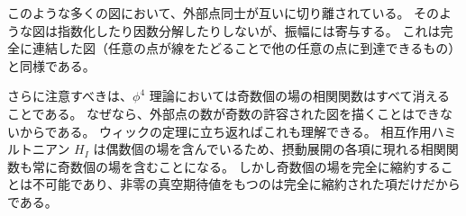 \documentclass[a4paper,12pt]{article}
\begin{document}
このような多くの図において、外部点同士が互いに切り離されている。  
そのような図は指数化したり因数分解したりしないが、振幅には寄与する。  
これは完全に連結した図（任意の点が線をたどることで他の任意の点に到達できるもの）と同様である。  


さらに注意すべきは、$\phi^4$ 理論においては奇数個の場の相関関数はすべて消えることである。  
なぜなら、外部点の数が奇数の許容された図を描くことはできないからである。  
ウィックの定理に立ち返ればこれも理解できる。  
相互作用ハミルトニアン $H_I$ は偶数個の場を含んでいるため、摂動展開の各項に現れる相関関数も常に奇数個の場を含むことになる。  
しかし奇数個の場を完全に縮約することは不可能であり、非零の真空期待値をもつのは完全に縮約された項だけだからである。
\end{document}

